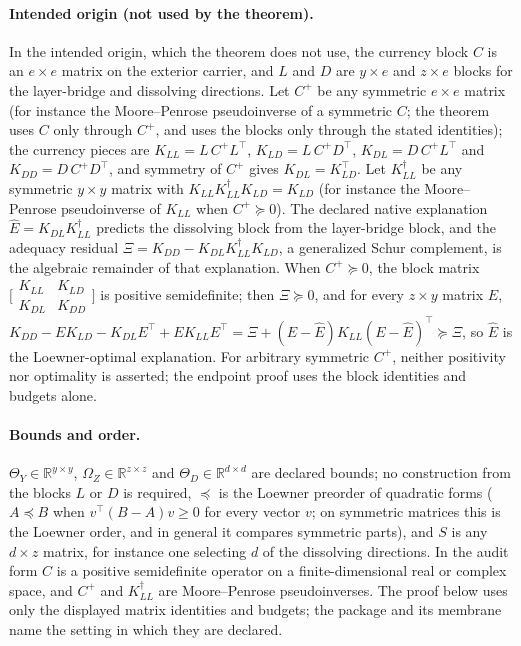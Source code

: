 \paragraph{Intended origin (not used by the theorem).} In the intended origin, which the theorem does not use, the currency
block \(C\) is an \(e\times e\) matrix on the exterior carrier, and \(L\)
and \(D\) are \(y\times e\) and \(z\times e\) blocks for the layer-bridge
and dissolving directions. Let \(C^{+}\) be any symmetric \(e\times e\) matrix (for instance the
Moore--Penrose pseudoinverse of a symmetric \(C\); the theorem uses \(C\) only through \(C^{+}\), and uses the blocks only
through the stated identities); the currency pieces are \(K_{LL}=L\,C^{+}L^{\!\top}\),
\(K_{LD}=L\,C^{+}D^{\!\top}\), \(K_{DL}=D\,C^{+}L^{\!\top}\) and
\(K_{DD}=D\,C^{+}D^{\!\top}\), and symmetry of \(C^{+}\) gives
\(K_{DL}=K_{LD}^{\!\top}\). Let \(K_{LL}^{\dagger}\) be any symmetric \(y\times y\)
matrix with \(K_{LL}K_{LL}^{\dagger}K_{LD}=K_{LD}\) (for instance the
Moore--Penrose pseudoinverse of \(K_{LL}\) when \(C^{+}\succeq0\)). The declared native explanation
\(\widehat E=K_{DL}K_{LL}^{\dagger}\) predicts the dissolving block from the
layer-bridge block, and the adequacy residual
\(\Xi=K_{DD}-K_{DL}K_{LL}^{\dagger}K_{LD}\), a generalized Schur complement,
is the algebraic remainder of that explanation. When \(C^{+}\succeq0\), the
block matrix \(\bigl[\begin{smallmatrix}K_{LL}&K_{LD}\\K_{DL}&K_{DD}\end{smallmatrix}\bigr]\)
is positive semidefinite; then \(\Xi\succeq0\), and for every \(z\times y\)
matrix \(E\),
\(K_{DD}-EK_{LD}-K_{DL}E^{\!\top}+EK_{LL}E^{\!\top}=\Xi+(E-\widehat E)K_{LL}(E-\widehat E)^{\!\top}\succeq\Xi\),
so \(\widehat E\) is the Loewner-optimal explanation. For arbitrary
symmetric \(C^{+}\), neither positivity nor optimality is asserted; the endpoint proof uses the block identities and
budgets alone.
\paragraph{Bounds and order.} \(\Theta_Y\in\mathbb R^{y\times y}\), \(\Omega_Z\in\mathbb R^{z\times z}\) and
\(\Theta_D\in\mathbb R^{d\times d}\) are declared bounds; no construction from the blocks \(L\) or \(D\) is required,
\(\preceq\) is the Loewner preorder of quadratic forms
(\(A\preceq B\) when \(v^{\!\top}(B-A)v\ge0\) for every vector \(v\); on
symmetric matrices this is the Loewner order, and in general it compares
symmetric parts), and \(S\) is any \(d\times z\) matrix, for instance
one selecting \(d\) of the dissolving directions.
In \citet{Tsiokos2026NeedleKiller} the audit form \(C\) is a positive
semidefinite operator on a finite-dimensional real or complex space, and
\(C^{+}\) and \(K_{LL}^{\dagger}\) are Moore--Penrose pseudoinverses.  The
proof below uses only the displayed matrix identities and budgets; the
package and its membrane name the setting in which they are declared.

